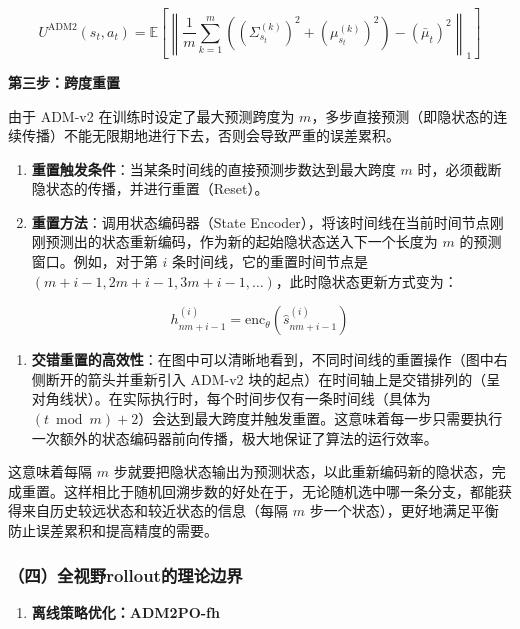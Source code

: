 \[
U^{\mathrm{ADM2}}(s_t,a_t)
=
\mathbb{E}
\left[
\left\|
\frac{1}{m}
\sum_{k=1}^{m}
\left(
(\Sigma_{s_t}^{(k)})^2
+
(\mu_{s_t}^{(k)})^2
\right)
-
(\bar{\mu}_t)^2
\right\|_1
\right]
\]

\textbf{第三步：跨度重置}

由于 ADM-v2 在训练时设定了最大预测跨度为 \(m\)，多步直接预测（即隐状态的连续传播）不能无限期地进行下去，否则会导致严重的误差累积。

\begin{enumerate}
\def\labelenumi{\arabic{enumi}.}
\item
  \textbf{重置触发条件}：当某条时间线的直接预测步数达到最大跨度 \(m\) 时，必须截断隐状态的传播，并进行重置（Reset）。
\item
  \textbf{重置方法}：调用状态编码器（State Encoder），将该时间线在当前时间节点刚刚预测出的状态重新编码，作为新的起始隐状态送入下一个长度为 \(m\) 的预测窗口。例如，对于第 \(i\) 条时间线，它的重置时间节点是 \((m+i-1,2m+i-1,3m+i-1,\ldots)\)，此时隐状态更新方式变为：
\end{enumerate}

\[
h_{nm+i-1}^{(i)}=\mathrm{enc}_\theta(\hat{s}_{nm+i-1}^{(i)})
\]

\begin{enumerate}
\def\labelenumi{\arabic{enumi}.}
\setcounter{enumi}{2}
\tightlist
\item
  \textbf{交错重置的高效性}：在图中可以清晰地看到，不同时间线的重置操作（图中右侧断开的箭头并重新引入 ADM-v2 块的起点）在时间轴上是交错排列的（呈对角线状）。在实际执行时，每个时间步仅有一条时间线（具体为 \((t\bmod m)+2\)）会达到最大跨度并触发重置。这意味着每一步只需要执行一次额外的状态编码器前向传播，极大地保证了算法的运行效率。
\end{enumerate}

这意味着每隔 \(m\) 步就要把隐状态输出为预测状态，以此重新编码新的隐状态，完成重置。这样相比于随机回溯步数的好处在于，无论随机选中哪一条分支，都能获得来自历史较远状态和较近状态的信息（每隔 \(m\) 步一个状态），更好地满足平衡防止误差累积和提高精度的需要。

\hypertarget{ux56dbux5168ux89c6ux91cerolloutux7684ux7406ux8bbaux8fb9ux754c}{%
\subsubsection{（四）全视野rollout的理论边界}\label{ux56dbux5168ux89c6ux91cerolloutux7684ux7406ux8bbaux8fb9ux754c}}

\begin{enumerate}
\def\labelenumi{\arabic{enumi}.}
\tightlist
\item
  \textbf{离线策略优化：ADM2PO-fh}
\end{enumerate}

